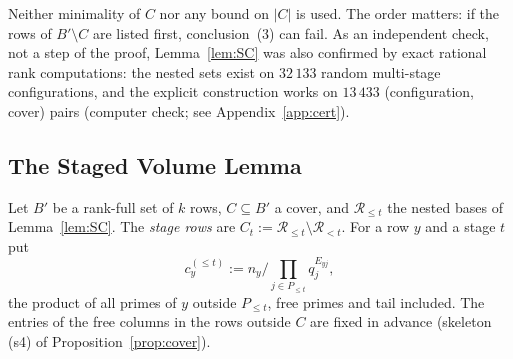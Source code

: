 \begin{remark}
Neither minimality of $C$ nor any bound on $|C|$ is used. The order matters: if the rows of $B'\setminus C$ are listed
first, conclusion~(3) can fail. As an independent check, not a step of the proof, Lemma~\ref{lem:SC} was also confirmed by exact rational rank
computations: the nested sets exist on $32\,133$ random multi-stage configurations, and the explicit construction works on
$13\,433$ (configuration, cover) pairs (computer check; see Appendix~\ref{app:cert}).
\end{remark}

\subsection{The Staged Volume Lemma}\label{sec:A-svl}

Let $B'$ be a rank-full set of $k$ rows, $C\subseteq B'$ a cover, and $\mathcal R_{\le t}$ the nested bases of
Lemma~\ref{lem:SC}. The \emph{stage rows} are $C_t:=\mathcal R_{\le t}\setminus\mathcal R_{<t}$. For a row $y$ and a
stage $t$ put
\[
  c_y^{(\le t)}:=n_y\Big/\prod_{j\in P_{\le t}}q_j^{E_{yj}},
\]
the product of all primes of $y$ outside $P_{\le t}$, free primes and tail included. The entries of the free columns in
the rows outside $C$ are fixed in advance (skeleton (s4) of Proposition~\ref{prop:cover}).

